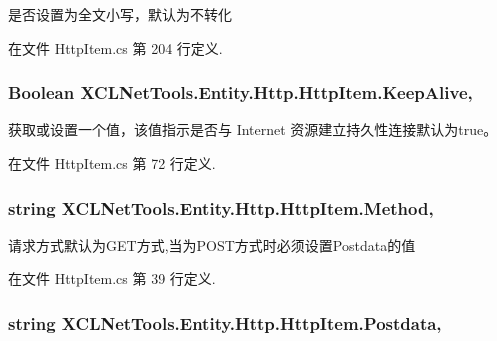 是否设置为全文小写，默认为不转化 



在文件 Http\-Item.\-cs 第 204 行定义.

\hypertarget{class_x_c_l_net_tools_1_1_entity_1_1_http_1_1_http_item_ab28dbd38f5c220a2a59193f6a69c34e2}{
\subsubsection[{Keep\-Alive}]{\setlength{\rightskip}{0pt plus 5cm}Boolean X\-C\-L\-Net\-Tools.\-Entity.\-Http.\-Http\-Item.\-Keep\-Alive\hspace{0.3cm}{\ttfamily [get]}, {\ttfamily [set]}}}\label{class_x_c_l_net_tools_1_1_entity_1_1_http_1_1_http_item_ab28dbd38f5c220a2a59193f6a69c34e2}


获取或设置一个值，该值指示是否与 Internet 资源建立持久性连接默认为true。 



在文件 Http\-Item.\-cs 第 72 行定义.

\hypertarget{class_x_c_l_net_tools_1_1_entity_1_1_http_1_1_http_item_a4c675d85e9d3864e5c5ad04c4a4ae3cd}{
\subsubsection[{Method}]{\setlength{\rightskip}{0pt plus 5cm}string X\-C\-L\-Net\-Tools.\-Entity.\-Http.\-Http\-Item.\-Method\hspace{0.3cm}{\ttfamily [get]}, {\ttfamily [set]}}}\label{class_x_c_l_net_tools_1_1_entity_1_1_http_1_1_http_item_a4c675d85e9d3864e5c5ad04c4a4ae3cd}


请求方式默认为\-G\-E\-T方式,当为\-P\-O\-S\-T方式时必须设置\-Postdata的值 



在文件 Http\-Item.\-cs 第 39 行定义.

\hypertarget{class_x_c_l_net_tools_1_1_entity_1_1_http_1_1_http_item_a9151cc1e4067ca0b035052ee0a8b3de9}{
\subsubsection[{Postdata}]{\setlength{\rightskip}{0pt plus 5cm}string X\-C\-L\-Net\-Tools.\-Entity.\-Http.\-Http\-Item.\-Postdata\hspace{0.3cm}{\ttfamily [get]}, {\ttfamily [set]}}}\label{class_x_c_l_net_tools_1_1_entity_1_1_http_1_1_http_item_a9151cc1e4067ca0b035052ee0a8b3de9}


